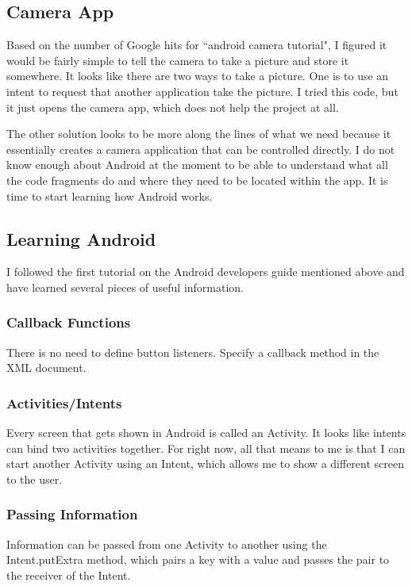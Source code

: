 \documentclass[]{article}
\begin{document}
			\subsection{Camera App}
				Based on the number of Google hits for ``android camera tutorial", I figured it would be fairly simple to tell the camera to take a picture and store it somewhere. It looks like there are two ways to take a picture. One is to use an intent to request that another application take the picture. I tried this code, but it just opens the camera app, which does not help the project at all.
				
				The other solution looks to be more along the lines of what we need because it essentially creates a camera application that can be controlled directly. I do not know enough about Android at the moment to be able to understand what all the code fragments do and where they need to be located within the app. It is time to start learning how Android works.
				
			\subsection{Learning Android}
				I followed the first tutorial on the Android developers guide mentioned above and have learned several pieces of useful information.
				
				\subsubsection{Callback Functions}
					There is no need to define button listeners. Specify a callback method in the XML document. 
					
				\subsubsection{Activities/Intents}
					Every screen that gets shown in Android is called an Activity. It looks like intents can bind two activities together. For right now, all that means to me is that I can start another Activity using an Intent, which allows me to show a different screen to the user.
					
				\subsubsection{Passing Information}
					Information can be passed from one Activity to another using the Intent.putExtra method, which pairs a key with a value and passes the pair to the receiver of the Intent.
	
\end{document}
